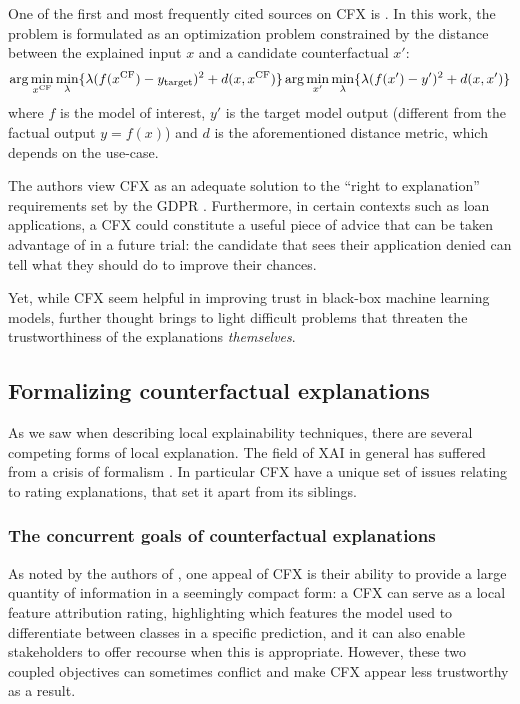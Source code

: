 \documentclass[../main.tex]{subfiles}
\begin{document}
One of the first and most frequently cited sources on CFX is \citeauthor{wachterCounterfactual2017} \cite{wachterCounterfactual2017}. In this work, the problem is formulated as an optimization problem constrained by the distance between the explained input $x$ and a candidate counterfactual $x'$:
\begin{equation}
\arg\min_{x^\mathrm{CF}} \min_\lambda \{ \lambda (f(x^\mathrm{CF}) - y_{\mathrm{target}})^2 + d(x, x^\mathrm{CF}) \}
\arg\min_{x'} \min_\lambda \{ \lambda (f(x') - y')^2 + d(x, x') \}
\end{equation}
where $f$ is the model of interest, $y'$ is the target model output
(different from the factual output $y = f(x)$) and $d$ is the aforementioned
distance metric, which depends on the use-case.

The authors view CFX as an adequate solution to the ``right to explanation'' requirements set by the GDPR \cite{kaminskiRight2018}.
Furthermore, in certain contexts such as loan applications, a CFX could constitute a useful piece of advice that can be taken advantage of in a future trial: the candidate that sees their application denied can tell what they should do to improve their chances.

Yet, while CFX seem helpful in improving trust in black-box machine learning models, further thought brings to light difficult problems that threaten the trustworthiness of the explanations \emph{themselves}.

\subsection{Formalizing counterfactual explanations}

As we saw when describing local explainability techniques, there are several competing forms of local explanation.
The field of XAI in general has suffered from a crisis of formalism \cite{liptonMythos2017, leavittFalsifiable2020}.
In particular CFX have a unique set of issues relating to rating explanations, that set it apart from its siblings.

\subsubsection{The concurrent goals of counterfactual explanations}

As noted by the authors of \cite{wachterCounterfactual2017}, one appeal of CFX is their ability to provide a large quantity of information in a seemingly compact form: a CFX can serve as a local feature attribution rating, highlighting which features the model used to differentiate between classes in a specific prediction, and it can also enable stakeholders to offer recourse when this is appropriate.
However, these two coupled objectives can sometimes conflict and make CFX appear less trustworthy as a result.
\end{document}
